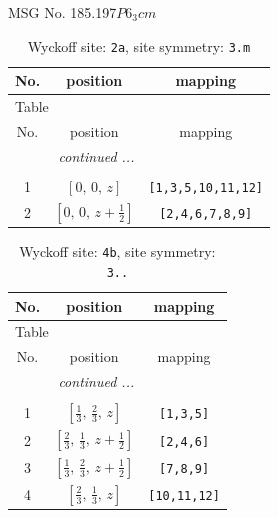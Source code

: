 \documentclass[fleqn,8pt]{jsarticle}
\begin{document}
\setcounter{MaxMatrixCols}{32}

\renewcommand{\tablename}{Table~}
\renewcommand{\figurename}{Figure~}
\begin{center}
\LARGE
MSG No. 185.197\quad$P6_{3}cm$
\end{center}
\renewcommand{\arraystretch}{1.2}
\begin{longtable}{ccc}
\caption{Wyckoff site: {\tt 2a}, site symmetry: {\tt 3.m}}
 \\
 \hline \hline
No. & position & mapping \\ \hline \endfirsthead

\multicolumn{2}{l}{\tablename\ \thetable{}} \\
 \hline \hline
No. & position & mapping \\ \hline \endhead

 \hline \hline
\multicolumn{2}{r}{\footnotesize\it continued ...} \\ \endfoot

 \hline \hline
\multicolumn{2}{r}{} \\ \endlastfoot

1 & $\left[ 0,\, 0,\, z \right]$ & {\tt [1,3,5,10,11,12]} \\ \hline
2 & $\left[ 0,\, 0,\, z + \frac{1}{2} \right]$ & {\tt [2,4,6,7,8,9]} \\
\end{longtable}
\renewcommand{\arraystretch}{1.2}
\begin{longtable}{ccc}
\caption{Wyckoff site: {\tt 4b}, site symmetry: {\tt 3..}}
 \\
 \hline \hline
No. & position & mapping \\ \hline \endfirsthead

\multicolumn{2}{l}{\tablename\ \thetable{}} \\
 \hline \hline
No. & position & mapping \\ \hline \endhead

 \hline \hline
\multicolumn{2}{r}{\footnotesize\it continued ...} \\ \endfoot

 \hline \hline
\multicolumn{2}{r}{} \\ \endlastfoot

1 & $\left[ \frac{1}{3},\, \frac{2}{3},\, z \right]$ & {\tt [1,3,5]} \\ \hline
2 & $\left[ \frac{2}{3},\, \frac{1}{3},\, z + \frac{1}{2} \right]$ & {\tt [2,4,6]} \\ \hline
3 & $\left[ \frac{1}{3},\, \frac{2}{3},\, z + \frac{1}{2} \right]$ & {\tt [7,8,9]} \\ \hline
4 & $\left[ \frac{2}{3},\, \frac{1}{3},\, z \right]$ & {\tt [10,11,12]} \\
\end{longtable}
\end{document}
